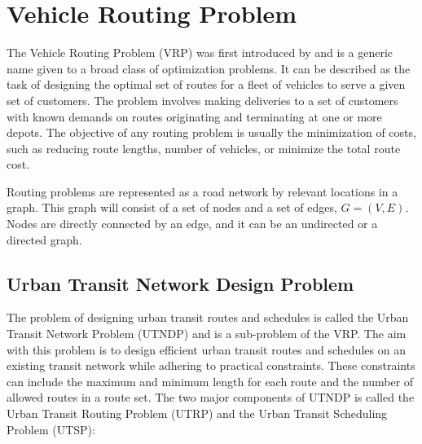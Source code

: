 \section{Vehicle Routing Problem }
\label{sec:VRP}
The Vehicle Routing Problem (VRP) was first introduced by \citet{dantzig59} and is a generic name given to a broad class of optimization problems. It can be described as the task of designing the optimal set of routes for a fleet of vehicles to serve a given set of customers. The problem involves making deliveries to a set of customers with known demands on routes originating and terminating at one or more depots. The objective of any routing problem is usually the minimization of costs, such as reducing route lengths, number of vehicles, or minimize the total route cost.

Routing problems are represented as a road network by relevant locations in a graph. This graph will consist of a set of nodes and a set of edges, $G = (V,E)$. Nodes are directly connected by an edge, and it can be an undirected or a directed graph. 

\subsection{Urban Transit Network Design Problem}

The problem of designing urban transit routes and schedules is called the Urban Transit Network Problem (UTNDP) and is a sub-problem of the VRP. The aim with this problem is to design efficient urban transit routes and schedules on an existing transit network while adhering to practical constraints. These constraints can include the maximum and minimum length for each route and the number of allowed routes in a route set. The two major components of UTNDP is called the Urban Transit Routing Problem (UTRP) and the Urban Transit Scheduling Problem (UTSP):


